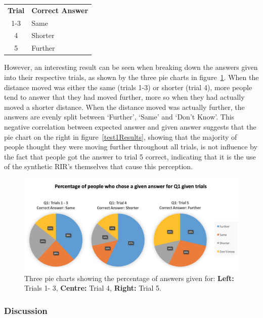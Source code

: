 \documentclass[../../main.tex]{subfiles}
\begin{document}
			\begin{center}
			\begin{tabular}{c l}
			\textbf{Trial} & \textbf{Correct Answer} \\
			1-3 & Same \\
			4 & Shorter \\
			5 & Further
			\end{tabular}
			\end{center}

			However, an interesting result can be seen when breaking down the answers given into their respective trials, as shown by the three pie charts in figure~\ref{Q1Trials}. When the distance moved was either the same (trials 1-3) or shorter (trial 4), more people tend to answer that they had moved further, more so when they had actually moved a shorter distance. When the distance moved was actually further, the answers are evenly split between `Further', `Same' and `Don't Know'. This negative correlation between expected answer and given answer suggests that the pie chart on the right in figure~\ref{test1Results}, showing that the majority of people thought they were moving further throughout all trials, is not influence by the fact that people got the answer to trial 5 correct, indicating that it is the use of the synthetic \ac{RIR}'s themselves that cause this perception.


			\begin{figure}[H]
				\centerline{\includegraphics[scale = 0.6]{Sections/userTesting/images/test1/Q1Trials.png}}
				\caption{Three pie charts showing the percentage of answers given for: \textbf{Left:} Trials 1- 3, \textbf{Centre:} Trial 4, \textbf{Right:} Trial 5.}
				\label{Q1Trials}
			\end{figure}

		\subsubsection{Discussion}
\end{document}
